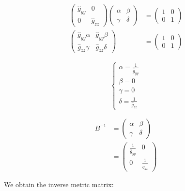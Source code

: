 \documentclass[english]{article}
\begin{document}
\begin{align*}
\begin{pmatrix}\hat{g}_{yy} & 0\\
0 & \hat{g}_{zz}
\end{pmatrix}\begin{pmatrix}\alpha & \beta\\
\gamma & \delta
\end{pmatrix} & =\begin{pmatrix}1 & 0\\
0 & 1
\end{pmatrix}\\
\begin{pmatrix}\hat{g}_{yy}\alpha & \hat{g}_{yy}\beta\\
\hat{g}_{zz}\gamma & \hat{g}_{zz}\delta
\end{pmatrix} & =\begin{pmatrix}1 & 0\\
0 & 1
\end{pmatrix}
\end{align*}

\[
\begin{cases}
\alpha=\frac{1}{\hat{g}_{yy}}\\
\beta=0\\
\gamma=0\\
\delta=\frac{1}{\hat{g}_{zz}}
\end{cases}
\]

\begin{align*}
B^{-1} & =\begin{pmatrix}\alpha & \beta\\
\gamma & \delta
\end{pmatrix}\\
 & =\begin{pmatrix}\frac{1}{\hat{g}_{yy}} & 0\\
0 & \frac{1}{\hat{g}_{zz}}
\end{pmatrix}
\end{align*}

We obtain the inverse metric matrix:
\end{document}
